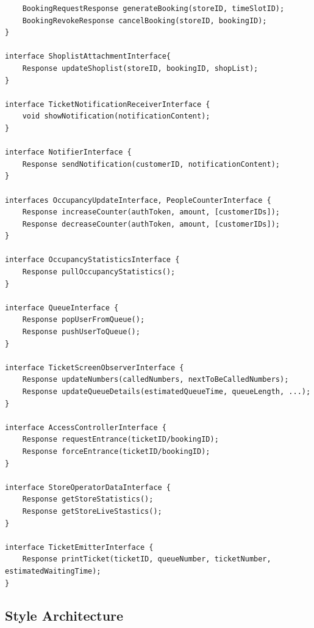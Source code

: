 \begin{lstlisting}
    BookingRequestResponse generateBooking(storeID, timeSlotID);
    BookingRevokeResponse cancelBooking(storeID, bookingID);
}

interface ShoplistAttachmentInterface{
    Response updateShoplist(storeID, bookingID, shopList);
}

interface TicketNotificationReceiverInterface {
    void showNotification(notificationContent);
}

interface NotifierInterface {
    Response sendNotification(customerID, notificationContent);
}

interfaces OccupancyUpdateInterface, PeopleCounterInterface {
    Response increaseCounter(authToken, amount, [customerIDs]);
    Response decreaseCounter(authToken, amount, [customerIDs]);
}

interface OccupancyStatisticsInterface {
    Response pullOccupancyStatistics();
}

interface QueueInterface {
    Response popUserFromQueue();
    Response pushUserToQueue();
}

interface TicketScreenObserverInterface {
    Response updateNumbers(calledNumbers, nextToBeCalledNumbers);
    Response updateQueueDetails(estimatedQueueTime, queueLength, ...);
}

interface AccessControllerInterface {
    Response requestEntrance(ticketID/bookingID);
    Response forceEntrance(ticketID/bookingID);
}

interface StoreOperatorDataInterface {
    Response getStoreStatistics();
    Response getStoreLiveStastics();
}

interface TicketEmitterInterface {
    Response printTicket(ticketID, queueNumber, ticketNumber, estimatedWaitingTime);
}

\end{lstlisting}


\subsection{Style Architecture}

